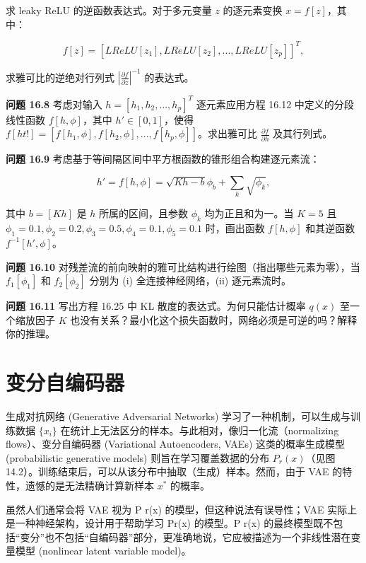 \documentclass[lang=cn,newtx,10pt,scheme=chinese]{elegantbook}
\begin{document}
求 leaky ReLU 的逆函数表达式。对于多元变量 \(z\) 的逐元素变换 \(x = f[z]\)，其中：

\begin{equation}
f[z] = [LReLU[z_1], LReLU[z_2], ..., LReLU[z_p]]^T, 
\end{equation}

求雅可比的逆绝对行列式 \(\left| \frac{\partial f}{\partial z} \right|^{-1}\) 的表达式。

\textbf{问题 16.8} 考虑对输入 \(h = [h_1, h_2, ..., h_p]^T\) 逐元素应用方程 16.12 中定义的分段线性函数 \(f[h, \phi]\)，其中 \(h' \in [0, 1]\)，使得 \(f[ht!] = [f[h_1, \phi], f[h_2, \phi], ..., f[h_p, \phi]]\)。求出雅可比 \(\frac{\partial f}{\partial h}\) 及其行列式。

\textbf{问题 16.9} 考虑基于等间隔区间中平方根函数的锥形组合构建逐元素流：

\begin{equation}
h' = f[h, \phi] = \sqrt{K h - b} \phi_b + \sum_{k} \sqrt{\phi_k}, 
\end{equation}

其中 \(b = [Kh]\) 是 \(h\) 所属的区间，且参数 \(\phi_k\) 均为正且和为一。当 \(K = 5\) 且 \(\phi_1 = 0.1, \phi_2 = 0.2, \phi_3 = 0.5, \phi_4 = 0.1, \phi_5 = 0.1\) 时，画出函数 \(f[h, \phi]\) 和其逆函数 \(f^{-1}[h', \phi]\)。

\textbf{问题 16.10} 对残差流的前向映射的雅可比结构进行绘图（指出哪些元素为零），当 \(f_1[\phi_1]\) 和 \(f_2[\phi_2]\) 分别为 (i) 全连接神经网络，(ii) 逐元素流时。

\textbf{问题 16.11} 写出方程 16.25 中 KL 散度的表达式。为何只能估计概率 \(q(x)\) 至一个缩放因子 \(K\) 也没有关系？最小化这个损失函数时，网络必须是可逆的吗？解释你的推理。

\chapter{变分自编码器}

生成对抗网络 (Generative Adversarial Networks) 学习了一种机制，可以生成与训练数据 \(\{x_i\}\) 在统计上无法区分的样本。与此相对，像归一化流（normalizing flows）、变分自编码器 (Variational Autoencoders, VAEs) 这类的概率生成模型 (probabilistic generative models) 则旨在学习覆盖数据的分布 \(P_r(x)\)（见图 14.2）。训练结束后，可以从该分布中抽取（生成）样本。然而，由于 VAE 的特性，遗憾的是无法精确计算新样本 \(x^*\) 的概率。

虽然人们通常会将 VAE 视为 P r(x) 的模型，但这种说法有误导性；VAE 实际上是一种神经架构，设计用于帮助学习 Pr(x) 的模型。P r(x) 的最终模型既不包括“变分”也不包括“自编码器”部分，更准确地说，它应被描述为一个非线性潜在变量模型 (nonlinear latent variable model)。
\end{document}
